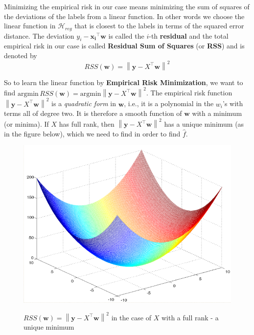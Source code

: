 \documentclass[11pt]{article}
\newcommand{\norm}[1]{\left\| #1\right\|}
\newcommand{\Tr}{\ensuremath{\top}}
\newcommand{\Hc}{\mathcal{H}}
\begin{document}
Minimizing the empirical risk in our case means minimizing the sum of squares of the deviations of the labels from a linear function. In other words we choose the linear function in $\Hc_{reg}$ that is closest to the labels in terms of the squared error distance. The deviation $y_i-\mathbf{x_i}^\Tr \mathbf{w}$ is called the $i$-th \textbf{residual} and the total empirical risk in our case is called \textbf{Residual Sum of Squares} (or \textbf{RSS}) and is denoted by
   \[
   RSS(\mathbf{w}) = \norm{\mathbf{y}-X^\Tr\mathbf{w}}^2
   \]

\vspace{5mm}

So to learn the linear function by \textbf{Empirical Risk Minimization}, we want to find $\text{argmin} \, RSS(\mathbf{w})=\text{argmin} \norm{\mathbf{y}-X^\Tr\mathbf{w}}^2$. The empirical risk function $\norm{\mathbf{y}-X^\Tr\mathbf{w}}^2$ is a \textit{quadratic form} in $\mathbf{w}$, i.e., it is a polynomial in the $w_i$'s with terms all of degree two. It is therefore a smooth function of $\mathbf{w}$ with a minimum (or minima). If $X$ has full rank, then $\norm{\mathbf{y}-X^\Tr\mathbf{w}}^2$ has a unique minimum (as in the figure below), which we need to find in order to find $\hat{f}$.

\begin{figure}[h!]
  \centering
    \includegraphics[width=4.5in]{parabola.png} \\
 \caption{$RSS(\mathbf{w})=\norm{\mathbf{y}-X^\Tr\mathbf{w}}^2$ in the case of $X$ with a full rank - a unique minimum}
\end{figure}

\vspace{5mm}
\end{document}
